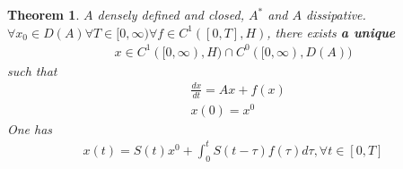 \documentclass[a4paper,11pt,fleqn]{book}
\newtheorem{theorem}{Theorem}[section]
\theoremstyle{definition}
\theoremstyle{remark}
\begin{document}
 
 \begin{theorem}
	$A$ densely defined and closed, $A^*$ and $A$ dissipative. $\forall x_0 \in D(A) \forall T \in [0, \infty) \forall f \in C^1([0, T], H)$, there exists \textbf{a unique} 
	\begin{align*}
		x \in C^1([0, \infty), H) \cap C^0([0, \infty), D(A))
	\end{align*}
	such that
	\begin{align*}
		&\frac{dx}{dt} = Ax + f(x) \\
		&x(0) = x^0
	\end{align*}
	One has
	\begin{align*}
		x(t) = S(t) x^0 + \int_0^t S(t - \tau) f(\tau) d\tau , \forall t \in [0, T]
	\end{align*}
\end{theorem}
\end{document}
